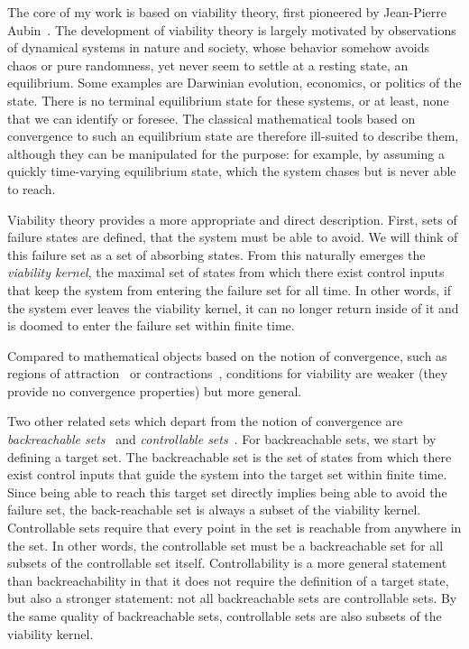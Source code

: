 The core of my work is based on viability theory, first pioneered by Jean-Pierre Aubin~\cite{aubin2011viability}. The development of viability theory is largely motivated by observations of dynamical systems in nature and society, whose behavior somehow avoids chaos or pure randomness, yet never seem to settle at a resting state, an equilibrium.
Some examples are Darwinian evolution, economics, or politics of the state. There is no terminal equilibrium state for these systems, or at least, none that we can identify or foresee.
The classical mathematical tools based on convergence to such an equilibrium state are therefore ill-suited to describe them, although they can be manipulated for the purpose: for example, by assuming a quickly time-varying equilibrium state, which the system chases but is never able to reach. \par
Viability theory provides a more appropriate and direct description. First, sets of failure states are defined, that the system must be able to avoid. We will think of this failure set as a set of absorbing states. From this naturally emerges the \emph{viability kernel}, the maximal set of states from which there exist control inputs that keep the system from entering the failure set for all time. In other words, if the system ever leaves the viability kernel, it can no longer return inside of it and is doomed to enter the failure set within finite time. \par
Compared to mathematical objects based on the notion of convergence, such as regions of attraction~\cite[(section 6.4)]{strogatz2018nonlinear} or contractions~\cite{bazzi2018stability}, conditions for viability are weaker (they provide no convergence properties) but more general. \par
Two other related sets which depart from the notion of convergence are \emph{backreachable sets}~\cite{bansal2017hamilton} and \emph{controllable sets}~\cite{zaytsev2018boundaries}. For backreachable sets, we start by defining a target set.
The backreachable set is the set of states from which there exist control inputs that guide the system into the target set within finite time.
Since being able to reach this target set directly implies being able to avoid the failure set, the back-reachable set is always a subset of the viability kernel.
Controllable sets require that every point in the set is reachable from anywhere in the set. In other words, the controllable set must be a backreachable set for all subsets of the controllable set itself. Controllability is a more general statement than backreachability in that it does not require the definition of a target state, but also a stronger statement: not all backreachable sets are controllable sets. By the same quality of backreachable sets, controllable sets are also subsets of the viability kernel. \par
